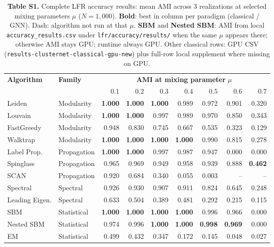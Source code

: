 \begin{table}[t]
\centering
\caption{\textbf{Table S1.} Complete LFR accuracy results: mean AMI across 3 realizations at selected mixing parameters $\mu$ ($N{=}1{,}000$). \textbf{Bold}: best in column per paradigm (classical / GNN). Dash: algorithm not run at that $\mu$. \textbf{SBM} and \textbf{Nested SBM}: AMI from local \texttt{accuracy\_results.csv} under \texttt{lfr/accuracy/results/} when the same $\mu$ appears there; otherwise AMI stays GPU; runtime always GPU. Other classical rows: GPU CSV (\texttt{results-clusternet-classical-gpu-new}) plus full-row local supplement where missing on GPU.}
\label{tab:supp_lfr_accuracy_full}
\small
\begin{tabular}{llrrrrrrr}
\toprule
\textbf{Algorithm} & \textbf{Family} & \multicolumn{7}{c}{\textbf{AMI at mixing parameter} $\mu$} \\
 & & $0.1$ & $0.2$ & $0.3$ & $0.4$ & $0.5$ & $0.6$ & $0.7$ \\
\midrule
Leiden & Modularity & \textbf{1.000} & \textbf{1.000} & \textbf{1.000} & 0.989 & 0.972 & 0.901 & 0.320 \\
Louvain & Modularity & \textbf{1.000} & \textbf{1.000} & 0.997 & 0.989 & 0.970 & 0.850 & 0.343 \\
FastGreedy & Modularity & 0.948 & 0.830 & 0.745 & 0.667 & 0.535 & 0.323 & 0.129 \\
Walktrap & Modularity & \textbf{1.000} & \textbf{1.000} & \textbf{1.000} & \textbf{1.000} & 0.990 & 0.815 & 0.278 \\
Label Prop. & Propagation & \textbf{1.000} & \textbf{1.000} & 0.997 & 0.987 & 0.947 & 0.000 & 0.000 \\
Spinglass & Propagation & 0.965 & 0.969 & 0.949 & 0.958 & 0.939 & 0.888 & \textbf{0.462} \\
SCAN & Propagation & 0.920 & 0.684 & 0.340 & 0.055 & 0.003 & -- & -- \\
Spectral & Spectral & 0.926 & 0.930 & 0.907 & 0.911 & 0.824 & 0.645 & 0.248 \\
Leading Eigen. & Spectral & 0.633 & 0.504 & 0.389 & 0.481 & 0.292 & 0.215 & 0.115 \\
SBM & Statistical & \textbf{1.000} & \textbf{1.000} & \textbf{1.000} & \textbf{1.000} & 0.996 & 0.966 & 0.000 \\
Nested SBM & Statistical & 0.974 & 0.996 & \textbf{1.000} & \textbf{1.000} & \textbf{0.998} & \textbf{0.969} & 0.000 \\
EM & Statistical & 0.499 & 0.432 & 0.347 & 0.172 & 0.145 & 0.048 & 0.027 \\

\end{tabular}
\end{table}
